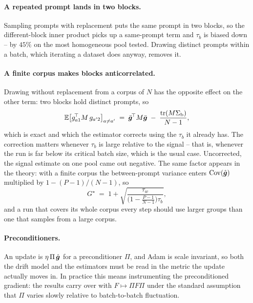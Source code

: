 \paragraph{A repeated prompt lands in two blocks.} Sampling prompts with replacement puts the same
prompt in two blocks, so the different-block inner product picks up a same-prompt term and
$\tau_b$ is biased down -- by $45\%$ on the most homogeneous pool tested. Drawing distinct prompts
within a batch, which iterating a dataset does anyway, removes it.

\paragraph{A finite corpus makes blocks anticorrelated.} Drawing without replacement from a corpus
of $N$ has the opposite effect on the other term: two blocks hold distinct prompts, so
\begin{equation}
  \label{eq:finite-corpus}
  \mathbb{E}\big[ g_{a1}^{\!\top} M\, g_{a'2} \big]_{a \neq a'}
  \;=\; \bar{\bm{g}}^{\!\top} M \bar{\bm{g}} \;-\; \frac{\operatorname{tr}(M\Sigma_{\mathrm{b}})}{N-1},
\end{equation}
which is exact and which the estimator corrects using the $\tau_b$ it already has. The correction
matters whenever $\tau_b$ is large relative to the signal -- that is, whenever the run is far below
its critical batch size, which is the usual case. Uncorrected, the signal estimate on one pool came
out negative. The same factor appears in the theory: with a finite corpus the between-prompt
variance enters $\operatorname{Cov}(\hat{\bm{g}})$ multiplied by $1 - (P-1)/(N-1)$, so
\begin{equation}
  \label{eq:gstar-corpus}
  G^{\star} \;=\; 1 + \sqrt{\frac{\tau_w}{\big(1 - \tfrac{P-1}{N-1}\big)\tau_b}},
\end{equation}
and a run that covers its whole corpus every step should use larger groups than one that samples
from a large corpus.

\paragraph{Preconditioners.} An update is $\eta\,\Pi\,\hat{\bm{g}}$ for a preconditioner $\Pi$, and Adam
is scale invariant, so both the drift model and the estimators must be read in the metric the
update actually moves in. In practice this means instrumenting the preconditioned gradient: the
results carry over with $F \mapsto \Pi F \Pi$ under the standard assumption that $\Pi$ varies
slowly relative to batch-to-batch fluctuation.

